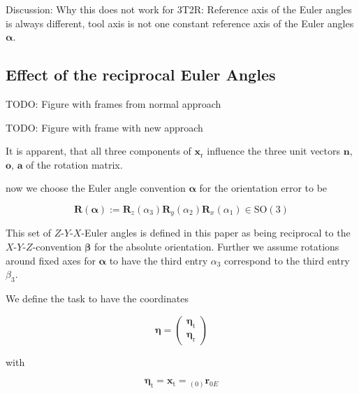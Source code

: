 \documentclass[twocolumn,10pt]{IFTOMM}
\newcommand{\bm}[1]{\boldsymbol{#1}}
\newcommand{\ortvek}[4]{{ }_{(#1)}{\boldsymbol{#2}}^{#3}_{#4} }
\newcommand{\vek}[3]{\boldsymbol{#1}^{#2}_{#3}}
\newcommand{\rotmat}[2]{{{ }^{#1}\boldsymbol{R}}_{#2}}
\newcommand{\transp}[0]{{\mathrm{T}}}
\begin{document}
Discussion: Why this does not work for 3T2R: Reference axis of the Euler angles is always different, tool axis is not one constant reference axis of the Euler angles $\bm{\alpha}$.

\subsection{Effect of the reciprocal Euler Angles}

TODO: Figure with frames from normal approach

TODO: Figure with frame with new approach


It is apparent, that all three components of $\bm{x}_{\mathrm{r}}$ influence the three unit vectors $\bm{n}$, $\bm{o}$, $\bm{a}$ of the rotation matrix.

now we choose the Euler angle convention $\bm{\alpha}$ for the orientation error to be 

\begin{equation}
\bm{R}(\bm{\alpha}) := \bm{R}_z(\alpha_3) \bm{R}_y(\alpha_2) \bm{R}_x(\alpha_1) \in \mathrm{SO(3)}
\end{equation}

This set of $Z$-$Y$-$X$-Euler angles is defined in this paper as being reciprocal to the $X$-$Y$-$Z$-convention $\bm{\beta}$ for the absolute orientation.
Further we assume rotations around fixed axes for $\bm{\alpha}$ to have the third entry $\alpha_3$ correspond to the third entry $\beta_3$.

We define the task to have the coordinates

\begin{equation}
\bm{\eta}
=
\begin{pmatrix}
\bm{\eta}_{\mathrm{t}} \\
\bm{\eta}_{\mathrm{r}}
\end{pmatrix}
\end{equation}  

with

\begin{equation}
\bm{\eta}_{\mathrm{t}}
=
\bm{x}_{\mathrm{t}}
=
\ortvek{0}{r}{}{0E}
\end{equation}  
\end{document}
